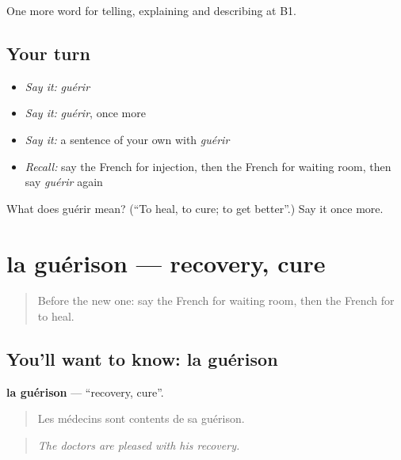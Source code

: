 \begin{grammarlens}[title={What you've built}]
One more word for telling, explaining and describing at B1.
\end{grammarlens}

\subsection*{Your turn}
\begin{itemize}
\raggedright
  \item \emph{Say it:} \emph{guérir}
  \item \emph{Say it:} \emph{guérir}, once more
  \item \emph{Say it:} a sentence of your own with \emph{guérir}
  \item \emph{Recall:} say the French for injection, then the French for waiting room, then say \emph{guérir} again
\end{itemize}

\begin{tcolorbox}[breakable,colback=teal!4,colframe=teal!35!black,title={Before you move on}]
What does guérir mean? (\textquotedblleft{}To heal, to cure; to get better\textquotedblright{}.) Say it once more.
\end{tcolorbox}
\section[la guérison]{la guérison — recovery, cure}

\label{lesson:FR-C485-guerison}



\begin{quote}
Before the new one: say the French for waiting room, then the French for to heal.
\end{quote}

\subsection*{You'll want to know: la guérison}
\textbf{la guérison} — \textquotedblleft{}recovery, cure\textquotedblright{}.

\begin{quote}
Les médecins sont contents de sa guérison.
\end{quote}

\begin{quote}
\emph{The doctors are pleased with his recovery.}
\end{quote}

